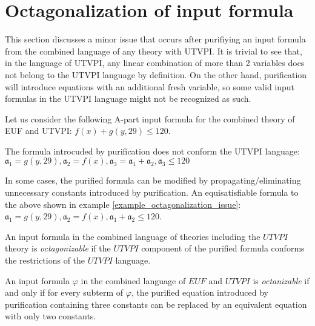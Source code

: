 \section{Octagonalization of input formula}

This section discusses a minor issue that occurs
after purifiying an input formula from the combined
language of any theory with UTVPI. It is trivial
to see that, in the language of UTVPI, any linear 
combination of more than 2 variables does not belong
to the UTVPI language by definition. On the other hand,
purification will introduce equations with an additional 
fresh variable, so some valid input formulas in the 
UTVPI language might not be recognized as such.

\begin{example} \label{example_octagonalization_issue}
  Let us consider the following A-part 
  input formula for the
  combined theory of EUF and UTVPI: 
  $f(x) + g(y, 29) \leq 120$.

  The formula introcuded by
  purification does not conform the UTVPI language:
  $\mathfrak{a_1} = g(y, 29), 
  \mathfrak{a_2} = f(x), 
  \mathfrak{a_3} = \mathfrak{a_1} + \mathfrak{a_2},
  \mathfrak{a_3} \leq 120$
\end{example}

In some cases, the purified formula can be modified by 
propagating/eliminating unnecessary constants introduced
by purification. An equisatisfiable formula to the 
above shown in example \ref{example_octagonalization_issue}:
$\mathfrak{a_1} = g(y, 29), 
\mathfrak{a_2} = f(x), 
\mathfrak{a_1} + \mathfrak{a_2} \leq 120$.

\begin{definition}
 An input formula in the combined language of theories including
 the $UTVPI$ theory is \emph{octagonizable} if the $UTVPI$
 component of the purified formula conforms the restrictions
 of the $UTVPI$ language.
\end{definition}

\begin{lemma}
  An input formula $\varphi$ in the combined language 
  of $EUF$ and $UTVPI$ is \emph{octanizable} if 
  and only if for every subterm of $\varphi$, the purified
  equation introduced by purification containing three 
  constants can be replaced by an equivalent equation
  with only two constants.
\end{lemma}

